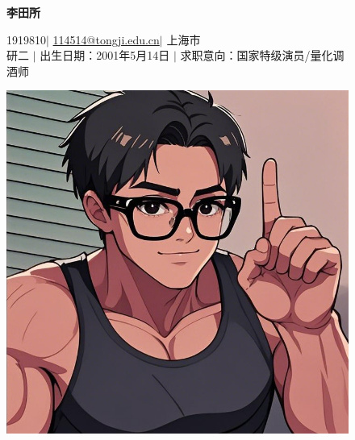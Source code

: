 \documentclass[4pt]{article}
\begin{document}
    \begin{figure}[h]
    \begin{minipage}{0.87\textwidth}
        \vspace{-1.8em}
        \begin{center}
            {\huge\bfseries 李田所}
            
            \vspace{0.5em} %
            1919810\quad$\vert$ \quad \href{mailto:114514@tongji.edu.cn} {114514@tongji.edu.cn}\quad$\vert$ \quad 上海市\\
            研二 \quad$\vert$ \quad 出生日期：2001年5月14日 \quad$\vert$ \quad 求职意向：国家特级演员/量化调酒师
            
        \end{center}
    \end{minipage}
    \begin{minipage}{0.12\textwidth}
        \vspace{-0.1em}
        \includegraphics[width=\linewidth]{images/先辈帅气版.png}
    \end{minipage}
    \end{figure}
\end{document}
